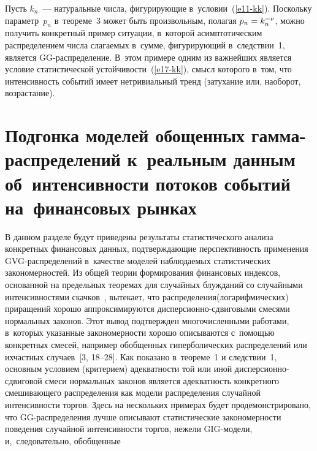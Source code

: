 \begin{multicols}{2}
Пусть $k_n$~--- натуральные числа, фигурирующие в~условии~(\ref{e11-kk}).
Поскольку параметр~$p_n$ в~тео\-ре\-ме~3 может быть произвольным,
полагая $p_n\hm=k_n^{-\nu}$, можно получить конкретный пример ситуации,
в~которой асимптотическим распределением числа слагаемых в~сумме,
фигурирующий в~следствии~1, являет\-ся GG-рас\-пре\-де\-ле\-ние. В~этом
примере одним из важнейших является условие статистической
устойчивости~(\ref{e17-kk}), смысл которого в~том, что интенсивность событий
имеет нетривиальный тренд (затухание или, наоборот, возрастание).



\section{Подгонка моделей обощенных гамма-распределений к~реальным данным об~интенсивности
потоков событий на~финансовых рынках}

В данном разделе будут приведены результаты статистического анализа
конкретных финансовых данных, подтверждающие перспективность
применения GVG-рас\-пре\-де\-ле\-ний в~качестве моде\-лей наблюдаемых
статистических закономерностей. Из общей теории формирования
финансовых индексов, основанной на предельных теоремах для случайных
блуж\-да\-ний со случайными интенсивностями скачков~\cite{Korolev2011-2},
вытекает, что распределения\linebreak (логариф\-мических) приращений хорошо
аппроксимируются дис\-пер\-си\-он\-но-сдви\-го\-вы\-ми смесями нормальных законов.
Этот вывод подтвержден многочисленными работами, в~которых указанные
закономерности хорошо описываются с~по\-мощью конкретных смесей,
например обобщенных гиперболических распределений или их\linebreak частных
случаев~[3, 18--28]. 
Как показано в~теореме~1 и следствии~1,
основным условием (критерием) адекватности той или иной
дис\-пер\-си\-он\-но-сдви\-го\-вой смеси нормальных законов является
адекватность конкретного смешивающего распределения как модели
распределения случайной интенсивности торгов. Здесь на нескольких
примерах будет продемонстрировано, что GG-рас\-пре\-де\-ле\-ния лучше
описывают статистические закономерности поведения случайной
интенсивности торгов, нежели GIG-мо\-де\-ли, и,~следовательно,
обобщенные\linebreak\vspace*{-12pt}

\pagebreak

\end{multicols}

